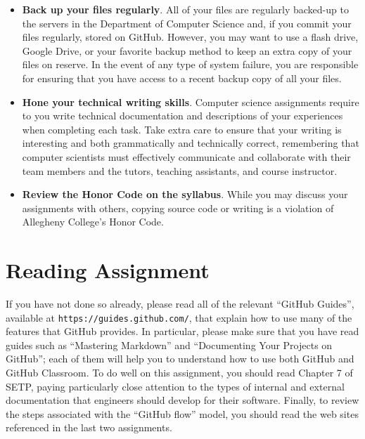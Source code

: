 \documentclass[11pt]{article}
\newcommand{\url}[1]{\lstinline{#1}}
\begin{document}
\begin{itemize}
\item {\bf Back up your files regularly}. All of your files are regularly backed-up to the servers in the Department of
  Computer Science and, if you commit your files regularly, stored on GitHub. However, you may want to use a flash
  drive, Google Drive, or your favorite backup method to keep an extra copy of your files on reserve. In the event of
  any type of system failure, you are responsible for ensuring that you have access to a recent backup copy of all your
  files.

\item {\bf Hone your technical writing skills}. Computer science assignments require to you write technical
  documentation and descriptions of your experiences when completing each task. Take extra care to ensure that your
  writing is interesting and both grammatically and technically correct, remembering that computer scientists must
  effectively communicate and collaborate with their team members and the tutors, teaching assistants, and course
  instructor.

\item {\bf Review the Honor Code on the syllabus}. While you may discuss your assignments with others, copying source
  code or writing is a violation of Allegheny College's Honor Code.

\end{itemize}

\vspace*{-1em}

\section*{Reading Assignment}

If you have not done so already, please read all of the relevant ``GitHub Guides'', available at
\url{https://guides.github.com/}, that explain how to use many of the features that GitHub provides. In particular,
please make sure that you have read guides such as ``Mastering Markdown'' and ``Documenting Your Projects on GitHub'';
each of them will help you to understand how to use both GitHub and GitHub Classroom. To do well on this assignment, you
should read Chapter 7 of SETP, paying particularly close attention to the types of internal and external documentation
that engineers should develop for their software. Finally, to review the steps associated with the ``GitHub flow''
model, you should read the web sites referenced in the last two assignments.
\end{document}
